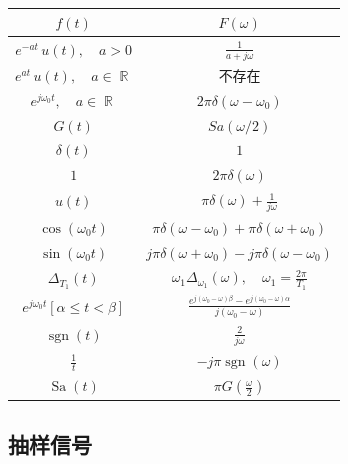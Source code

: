 \documentclass{ctexart}
\DeclareMathOperator{\Rset}{\mathbb{R}}
\DeclareMathOperator{\sgn}{\mathrm{sgn}}
\DeclareMathOperator{\Sa}{\mathrm{Sa}}
\begin{document}
    \begin{table}[ht!]
        \centering
        \begin{tabular}{|c|c|}
                \hline $\displaystyle f(t)$ & $\displaystyle F(\omega)$ \\ \hline
                $\displaystyle e^{-at}\,u(t),\quad a > 0$ & $\displaystyle \frac{1}{a + j \omega}$ \\ \hline
                $\displaystyle e^{at}\,u(t),\quad a \in \Rset$ & 不存在 \\ \hline
                $\displaystyle e^{j \omega_0 t},\quad a \in \Rset$ & $\displaystyle 2 \pi \delta(\omega - \omega_0)$ \\ \hline
                $\displaystyle G(t)$ & $\displaystyle Sa(\omega / 2)$ \\ \hline
                $\displaystyle \delta(t)$ & $\displaystyle 1$ \\ \hline
                $\displaystyle 1$ & $\displaystyle 2\pi \delta(\omega)$ \\ \hline
                $\displaystyle u(t)$ & $\displaystyle \pi\delta(\omega) + \frac{1}{j\omega}$ \\ \hline
                $\displaystyle \cos (\omega_0 t)$ & $\displaystyle \pi \delta(\omega - \omega_0) + \pi \delta(\omega + \omega_0)$ \\ \hline
                $\displaystyle \sin (\omega_0 t)$ & $\displaystyle j \pi \delta(\omega + \omega_0) - j \pi \delta(\omega - \omega_0)$ \\ \hline
                $\displaystyle \Delta_{T_1} (t)$ & $\displaystyle \omega_1 \Delta_{\omega_1}(\omega),\quad \omega_1 = \frac{2\pi}{T_1}$ \\ \hline
                $\displaystyle e^{j \omega_0 t} [\alpha \le t < \beta]$ & $\displaystyle \frac{e^{j(\omega_0 - \omega)\beta} - e^{j(\omega_0-\omega)\alpha}}{j (\omega_0 - \omega)}$ \\ \hline
                $\displaystyle \sgn(t)$ & $\displaystyle \frac{2}{j\omega}$\\\hline
                $\displaystyle \frac{1}{t}$ & $\displaystyle -j \pi \sgn(\omega)$\\\hline
                $\displaystyle \Sa(t)$ & $\displaystyle \pi G \left( \frac{\omega}{2} \right) $\\ \hline
        \end{tabular}
    \end{table}

\subsection{抽样信号}
\end{document}
